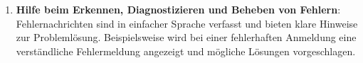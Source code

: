 \begin{enumerate}
	\item \textbf{Hilfe beim Erkennen, Diagnostizieren und Beheben von Fehlern}: Fehlernachrichten sind in einfacher Sprache verfasst und bieten klare Hinweise zur Problemlösung. Beispielsweise wird bei einer fehlerhaften Anmeldung eine verständliche Fehlermeldung angezeigt und mögliche Lösungen vorgeschlagen.
\end{enumerate}




